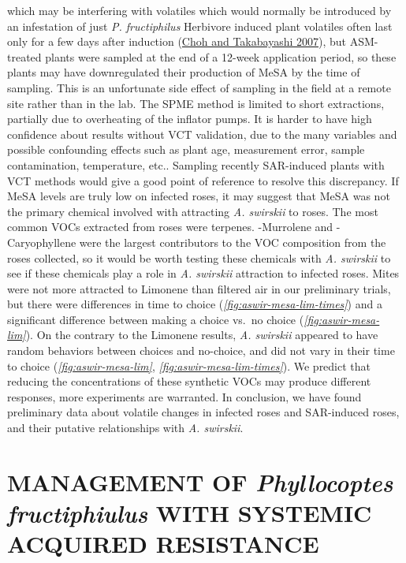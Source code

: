 \documentclass{ufdissertation}[overrideChapters] %
\begin{document}
{which may be interfering with volatiles which would normally be introduced by an infestation of just \emph{P. fructiphilus} Herbivore induced plant volatiles often last only for a few days after induction (\protect\hyperlink{ref-Choh2007}{Choh and Takabayashi 2007}), but ASM-treated plants were sampled at the end of a 12-week application period, so these plants may have downregulated their production of MeSA by the time of sampling. This is an unfortunate side effect of sampling in the field at a remote site rather than in the lab. The SPME method is limited to short extractions, partially due to overheating of the inflator pumps. It is harder to have high confidence about results without VCT validation, due to the many variables and possible confounding effects such as plant age, measurement error, sample contamination, temperature, etc.. Sampling recently SAR-induced plants with VCT methods would give a good point of reference to resolve this discrepancy. If MeSA levels are truly low on infected roses, it may suggest that MeSA was not the primary chemical involved with attracting \emph{A. swirskii} to roses. The most common VOCs extracted from roses were terpenes. \textgamma-Murrolene and \textbeta-Caryophyllene were the largest contributors to the VOC composition from the roses collected, so it would be worth testing these chemicals with \emph{A. swirskii} to see if these chemicals play a role in \emph{A. swirskii} attraction to infected roses. Mites were not more attracted to Limonene than filtered air in our preliminary trials, but there were differences in time to choice (\emph{\ref{fig:aswir-mesa-lim-times}}) and a significant difference between making a choice vs.~no choice (\emph{\ref{fig:aswir-mesa-lim}}). On the contrary to the Limonene results, \emph{A. swirskii} appeared to have random behaviors between choices and no-choice, and did not vary in their time to choice (\emph{\ref{fig:aswir-mesa-lim}}, \emph{\ref{fig:aswir-mesa-lim-times}}). We predict that reducing the concentrations of these synthetic VOCs may produce different responses, more experiments are warranted. In conclusion, we have found preliminary data about volatile changes in infected roses and SAR-induced roses, and their putative relationships with \emph{A. swirskii}.

\hypertarget{management-of-phyllocoptes-fructiphiulus-with-systemic-acquired-resistance}{%
\chapter{\texorpdfstring{MANAGEMENT OF \emph{Phyllocoptes fructiphiulus} WITH SYSTEMIC ACQUIRED RESISTANCE}{MANAGEMENT OF Phyllocoptes fructiphiulus WITH SYSTEMIC ACQUIRED RESISTANCE}}\label{management-of-phyllocoptes-fructiphiulus-with-systemic-acquired-resistance}}

}
\end{document}
